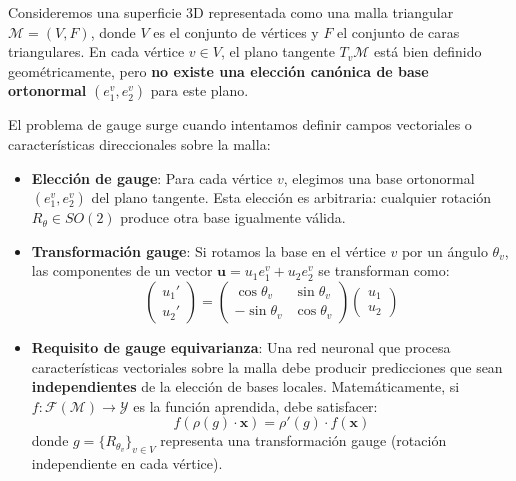 \begin{example}\label{ex:gauge_mallas_3d}
Consideremos una superficie 3D representada como una malla triangular $\mathcal{M} = (V, F)$, donde $V$ es el conjunto de vértices y $F$ el conjunto de caras triangulares. En cada vértice $v \in V$, el plano tangente $T_v\mathcal{M}$ está bien definido geométricamente, pero \textbf{no existe una elección canónica de base ortonormal} $(e_1^v, e_2^v)$ para este plano.

El problema de gauge surge cuando intentamos definir campos vectoriales o características direccionales sobre la malla:
\begin{itemize}
    \item \textbf{Elección de gauge}: Para cada vértice $v$, elegimos una base ortonormal $(e_1^v, e_2^v)$ del plano tangente. Esta elección es arbitraria: cualquier rotación $R_\theta \in SO(2)$ produce otra base igualmente válida.

    \item \textbf{Transformación gauge}: Si rotamos la base en el vértice $v$ por un ángulo $\theta_v$, las componentes de un vector $\mathbf{u} = u_1 e_1^v + u_2 e_2^v$ se transforman como:
    \begin{equation}
    \begin{pmatrix} u_1' \\ u_2' \end{pmatrix} = \begin{pmatrix} \cos\theta_v & \sin\theta_v \\ -\sin\theta_v & \cos\theta_v \end{pmatrix} \begin{pmatrix} u_1 \\ u_2 \end{pmatrix}
    \end{equation}

    \item \textbf{Requisito de gauge equivarianza}: Una red neuronal que procesa características vectoriales sobre la malla debe producir predicciones que sean \textbf{independientes} de la elección de bases locales. Matemáticamente, si $f: \mathcal{F}(\mathcal{M}) \to \mathcal{Y}$ es la función aprendida, debe satisfacer:
    \begin{equation}
    f(\rho(g) \cdot \mathbf{x}) = \rho'(g) \cdot f(\mathbf{x})
    \end{equation}
    donde $g = \{R_{\theta_v}\}_{v \in V}$ representa una transformación gauge (rotación independiente en cada vértice).
\end{itemize}
\end{example}

